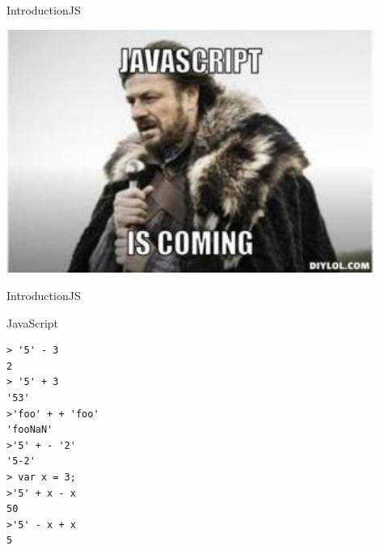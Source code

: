 \documentclass[10pt]{beamer}
\begin{document}
\begin{frame}{Introduction}{JS}
\begin{center}
	\includegraphics[width=0.9\textwidth]{pictures/JS.jpg}
\end{center}
\end{frame}

\begin{frame}[fragile]{Introduction}{JS}
\begin{center}
		
\begin{block}{JavaScript}
			
\begin{lstlisting}
> '5' - 3
2
> '5' + 3
'53'
>'foo' + + 'foo'
'fooNaN'
>'5' + - '2'
'5-2'
> var x = 3;
>'5' + x - x
50
>'5' - x + x
5

\end{lstlisting}
			
			
\end{block}
		
\end{center}
	
\end{frame}
\end{document}
